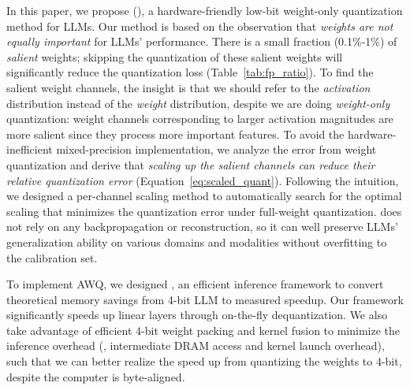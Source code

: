 In this paper, we propose  \method (\methodshort), a hardware-friendly low-bit weight-only quantization method for LLMs. Our method is based on the observation that \emph{weights are not equally important} for LLMs' performance. There is a small fraction (0.1\%-1\%) of \emph{salient} weights; skipping the quantization of these salient weights will significantly reduce the quantization loss (Table~\ref{tab:fp_ratio}). To find the salient weight channels, the insight is that we should refer to the \emph{activation} distribution instead of the \emph{weight} distribution, despite we are doing \emph{weight-only} quantization: weight channels corresponding to larger activation magnitudes are more salient since they process more important features. 
To avoid the hardware-inefficient mixed-precision implementation, we analyze the error from weight quantization and derive that \emph{scaling up the salient channels can reduce their relative quantization error} (Equation~\ref{eq:scaled_quant}). Following the intuition, we designed a per-channel scaling method to automatically search for the optimal scaling that minimizes the quantization error under full-weight quantization.
\methodshort does not rely on any backpropagation or reconstruction, so it can well preserve LLMs’ generalization ability on various domains and modalities without overfitting to the calibration set. 

To implement AWQ, we designed \system, an efficient inference framework to convert theoretical memory savings from 4-bit LLM to measured speedup. Our framework significantly speeds up linear layers through on-the-fly dequantization. We also take advantage of efficient 4-bit weight packing and kernel fusion to minimize the inference overhead (\eg, intermediate DRAM access and kernel launch overhead), such that we can better realize the speed up from quantizing the weights to 4-bit, despite the computer is byte-aligned. 

